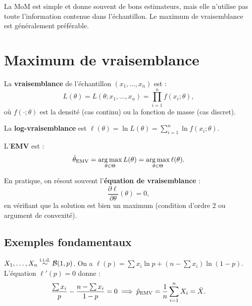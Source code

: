 \begin{intuition}
La MoM est simple et donne souvent de bons estimateurs, mais elle n'utilise pas toute l'information contenue dans l'\'echantillon. Le maximum de vraisemblance est g\'en\'eralement pr\'ef\'erable.
\end{intuition}

\section{Maximum de vraisemblance}
\label{sec:emv}

\begin{definition}
La \textbf{vraisemblance} de l'\'echantillon $(x_1,\ldots,x_n)$ est :
\[
L(\theta) = L(\theta;x_1,\ldots,x_n) = \prod_{i=1}^n f(x_i;\theta),
\]
o\`u $f(\cdot;\theta)$ est la densit\'e (cas continu) ou la fonction de masse (cas discret).

La \textbf{log-vraisemblance} est $\ell(\theta)=\ln L(\theta) = \sum_{i=1}^n \ln f(x_i;\theta)$.
\end{definition}

\begin{definition}
L'\textbf{EMV} est :
\[
\hat{\theta}_{\mathrm{EMV}} = \operatorname*{arg\,max}_{\theta\in\Theta} L(\theta) = \operatorname*{arg\,max}_{\theta\in\Theta} \ell(\theta).
\]
\end{definition}

\begin{remarque}
En pratique, on r\'esout souvent l'\textbf{\'equation de vraisemblance} :
\[
\frac{\partial \ell}{\partial \theta}(\theta) = 0,
\]
en v\'erifiant que la solution est bien un maximum (condition d'ordre 2 ou argument de convexit\'e).
\end{remarque}

\subsection{Exemples fondamentaux}

\begin{exemple}
$X_1,\ldots,X_n\overset{\text{i.i.d.}}{\sim}\mathcal{B}(1,p)$. On a $\ell(p)=\sum x_i\ln p + (n-\sum x_i)\ln(1-p)$. L'\'equation $\ell'(p)=0$ donne :
\[
\frac{\sum x_i}{p} - \frac{n-\sum x_i}{1-p} = 0 \implies \hat{p}_{\mathrm{EMV}} = \frac{1}{n}\sum_{i=1}^n X_i = \bar{X}.
\]
\end{exemple}

